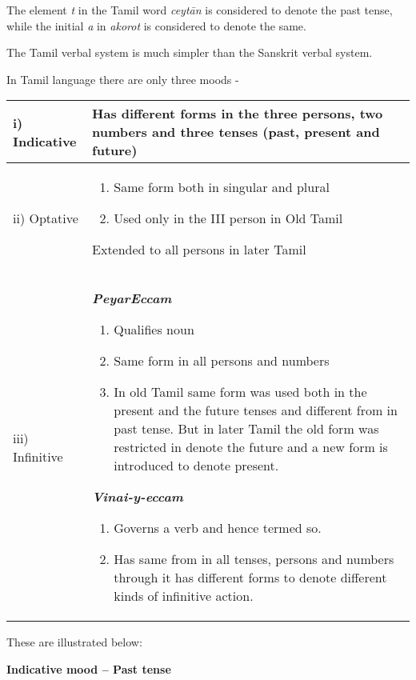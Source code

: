 The element \textit{t} in the Tamil word \textit{ceytān} is considered to denote the past tense, while the initial \textit{a} in \textit{akorot} is considered to denote the same.

The Tamil verbal system is much simpler than the Sanskrit verbal system.

In Tamil language there are only three moods -

\begin{longtable}{|m{2cm}|m{6.8cm}|}
\hline
i) Indicative & Has different forms in the three persons, two numbers and three tenses (past, present and future) \\
\hline
ii) Optative & 
							
\begin{enumerate}\item Same form both in singular and plural 
								\item Used only in the III person in Old Tamil
							
\end{enumerate}
Extended to all persons  in later Tamil

						 \tabularnewline
\hline
iii) Infinitive & 
							\textbf{\textit{PeyarEccam}}

							
\begin{enumerate}\item Qualifies noun
								\item Same form in all persons and numbers
								\item In old Tamil same form was used both in the present and the future tenses and different from in past tense. But in later Tamil the old form was restricted in denote the future and a new form is introduced to denote present.
							
\end{enumerate}
\textbf{\textit{Vinai-y-eccam}}

							
\begin{enumerate}\item Governs a verb and hence termed so.
								\item Has same from in all tenses, persons and numbers through it has different forms to denote different kinds of infinitive action.
							
\end{enumerate}
 \tabularnewline
\hline
\end{longtable}

These are illustrated below:

\textbf{Indicative mood – Past tense}

